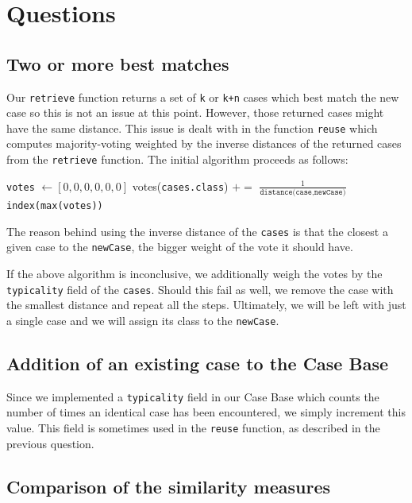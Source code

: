 \documentclass[a4paper]{article}
\begin{document}
\section{Questions}
\subsection{Two or more best matches}

Our \texttt{retrieve} function returns a set of \texttt{k} or \texttt{k+n} cases which best match the new case so this is not an issue at this point. However, those returned cases might have the same distance. This issue is dealt with in the function \texttt{reuse} which computes majority-voting weighted by the inverse distances of the returned cases from the \texttt{retrieve} function. The initial algorithm proceeds as follows: \medskip
\begin{algorithmic}
\State \texttt{votes} $\gets [0,0,0,0,0,0]$
     	\State votes(\texttt{cases.class}) $+=$ $\frac{1}{\texttt{distance(case,newCase})}$
     \EndFor \\
\Return \texttt{index(max(votes))} 
\end{algorithmic} \medskip
The reason behind using the inverse distance of the \texttt{cases} is that the closest a given case to the \texttt{newCase}, the bigger weight of the vote it should have.\medskip

If the above algorithm is inconclusive, we additionally weigh the votes by the \texttt{typicality} field of the \texttt{cases}. Should this fail as well, we remove the case with the smallest distance and repeat all the steps. Ultimately, we will be left with just a single case and we will assign its class to the \texttt{newCase}.

\subsection{Addition of an existing case to the Case Base}

Since we implemented a \texttt{typicality} field in our Case Base which counts the number of times an identical case has been encountered, we simply increment this value. This field is sometimes used in the \texttt{reuse} function, as described in the previous question.

\subsection{Comparison of the similarity measures}
\end{document}
